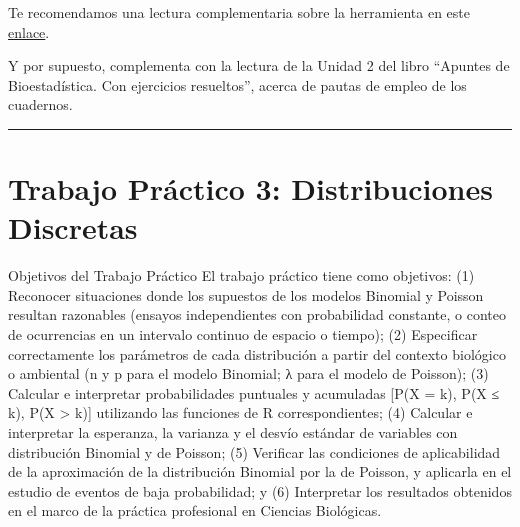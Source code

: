 \documentclass[
  spanish,
  letterpaper,
  DIV=11,
  numbers=noendperiod]{scrreprt}
\begin{document}
Te recomendamos una lectura complementaria sobre la herramienta en este
\href{https://www.datacamp.com/es/tutorial/notebooklm}{enlace}.

Y por supuesto, complementa con la lectura de la Unidad 2 del libro
``Apuntes de Bioestadística. Con ejercicios resueltos'', acerca de
pautas de empleo de los cuadernos.

\begin{center}\rule{0.5\linewidth}{0.5pt}\end{center}


\chapter{Trabajo Práctico 3: Distribuciones
Discretas}\label{trabajo-pruxe1ctico-3-distribuciones-discretas}

Objetivos del Trabajo Práctico El trabajo práctico tiene como objetivos:
(1) Reconocer situaciones donde los supuestos de los modelos Binomial y
Poisson resultan razonables (ensayos independientes con probabilidad
constante, o conteo de ocurrencias en un intervalo continuo de espacio o
tiempo); (2) Especificar correctamente los parámetros de cada
distribución a partir del contexto biológico o ambiental (n y p para el
modelo Binomial; λ para el modelo de Poisson); (3) Calcular e
interpretar probabilidades puntuales y acumuladas {[}P(X = k), P(X ≤ k),
P(X \textgreater{} k){]} utilizando las funciones de R correspondientes;
(4) Calcular e interpretar la esperanza, la varianza y el desvío
estándar de variables con distribución Binomial y de Poisson; (5)
Verificar las condiciones de aplicabilidad de la aproximación de la
distribución Binomial por la de Poisson, y aplicarla en el estudio de
eventos de baja probabilidad; y (6) Interpretar los resultados obtenidos
en el marco de la práctica profesional en Ciencias Biológicas.
\end{document}
